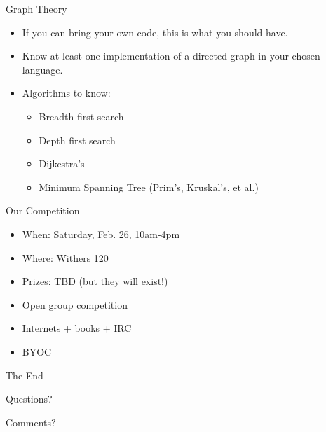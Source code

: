 \documentclass{beamer}
\begin{document}
\begin{frame}{Graph Theory}
  \begin{centering}
    \begin{itemize}
      \item If you can bring your own code, this is what you should have. 
      \item Know at least one implementation of a directed graph in your chosen language.
      \item Algorithms to know:
        \begin{itemize}
          \item Breadth first search
          \item Depth first search
          \item Dijkestra's 
          \item Minimum Spanning Tree (Prim's, Kruskal's, et al.)
        \end{itemize}
    \end{itemize}
  \end{centering}
\end{frame}

\begin{frame}{Our Competition}
  \begin{centering}
    \begin{itemize}
      \item When: Saturday, Feb. 26, 10am-4pm
      \item Where: Withers 120
      \item Prizes: TBD (but they will exist!)
      \item Open group competition
      \item Internets + books + IRC
      \item BYOC 
    \end{itemize}
  \end{centering}
\end{frame}

\begin{frame}{The End}
  \centerline{\huge Questions?}
  \centerline{Comments?}
\end{frame}
  
\end{document}

